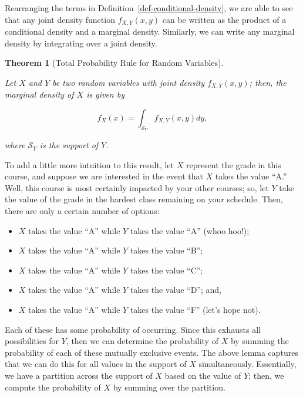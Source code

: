 \documentclass[
  letterpaper,
  DIV=11,
  numbers=noendperiod]{scrreprt}
\providecommand{\tightlist}{%
  \setlength{\itemsep}{0pt}\setlength{\parskip}{0pt}}\usepackage{longtable,booktabs,array}
\theoremstyle{definition}
\theoremstyle{definition}
\theoremstyle{plain}
\newtheorem{theorem}{Theorem}[chapter]
\theoremstyle{remark}
\begin{document}
Rearranging the terms in Definition~\ref{def-conditional-density}, we
are able to see that any joint density function \(f_{X, Y}(x, y)\) can
be written as the product of a conditional density and a marginal
density. Similarly, we can write any marginal density by integrating
over a joint density.

\begin{theorem}[Total Probability Rule for Random
Variables]\protect\hypertarget{thm-total-probability-rule}{}\label{thm-total-probability-rule}

Let \(X\) and \(Y\) be two random variables with joint density
\(f_{X,Y}(x,y)\); then, the marginal density of \(X\) is given by

\[f_X(x) = \int_{\mathcal{S}_Y} f_{X,Y}(x, y) dy,\]

where \(\mathcal{S}_Y\) is the support of \(Y\).

\end{theorem}

To add a little more intuition to this result, let \(X\) represent the
grade in this course, and suppose we are interested in the event that
\(X\) takes the value ``A.'' Well, this course is most certainly
impacted by your other courses; so, let \(Y\) take the value of the
grade in the hardest class remaining on your schedule. Then, there are
only a certain number of options:

\begin{itemize}
\tightlist
\item
  \(X\) takes the value ``A'' while \(Y\) takes the value ``A'' (whoo
  hoo!);
\item
  \(X\) takes the value ``A'' while \(Y\) takes the value ``B'';
\item
  \(X\) takes the value ``A'' while \(Y\) takes the value ``C'';
\item
  \(X\) takes the value ``A'' while \(Y\) takes the value ``D''; and,
\item
  \(X\) takes the value ``A'' while \(Y\) takes the value ``F'' (let's
  hope not).
\end{itemize}

Each of these has some probability of occurring. Since this exhausts all
possibilities for \(Y\), then we can determine the probability of \(X\)
by summing the probability of each of these mutually exclusive events.
The above lemma captures that we can do this for all values in the
support of \(X\) simultaneously. Essentially, we have a partition across
the support of \(X\) based on the value of \(Y\); then, we compute the
probability of \(X\) by summing over the partition.
\end{document}
